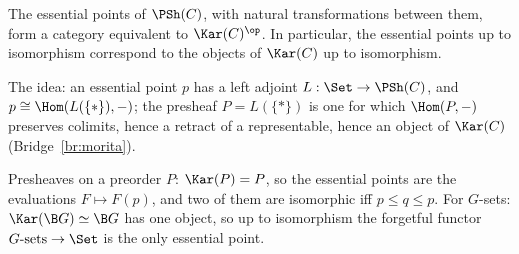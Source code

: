 \begin{bridge}\label{br:pts}
The essential points of $\PSh(C)$, with natural transformations between them, form a category equivalent to $\Kar(C)^{\op}$. In particular, the essential points up to isomorphism correspond to the objects of $\Kar(C)$ up to isomorphism.
\end{bridge}

The idea: an essential point $p$ has a left adjoint $L : \Set\to\PSh(C)$, and $p\cong\Hom(L(\{\ast\}),-)$; the presheaf $P = L(\{\ast\})$ is one for which $\Hom(P,-)$ preserves colimits, hence a retract of a representable, hence an object of $\Kar(C)$ (Bridge~\ref{br:morita}). 

\begin{example}
Presheaves on a preorder $P$: $\Kar(P) = P$, so the essential points are the evaluations $F\mapsto F(p)$, and two of them are isomorphic iff $p\le q\le p$. For $G$-sets: $\Kar(\B G)\simeq\B G$ has one object, so up to isomorphism the forgetful functor $G\text{-sets}\to\Set$ is the only essential point.
\end{example}
